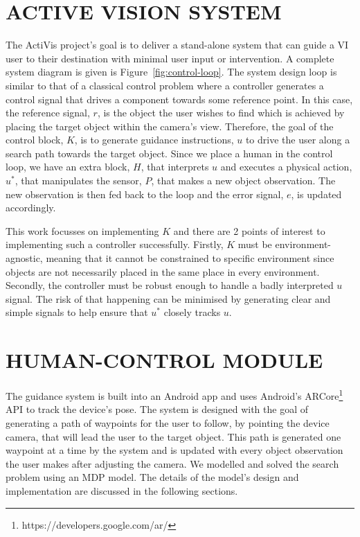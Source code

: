 \documentclass[a4paper, twoside]{article}
\begin{document}
\section{\uppercase{Active Vision System}}\label{sec:system-design}

\noindent The ActiVis project's goal is to deliver a stand-alone system that can guide a VI user to their destination with minimal user input or intervention. A complete system diagram is given is Figure~\ref{fig:control-loop}. The system design loop is similar to that of a classical control problem where a controller generates a control signal that drives a component towards some reference point. In this case, the reference signal, $r$, is the object the user wishes to find which is achieved by placing the target object within the camera's view. Therefore, the goal of the control block, $K$, is to generate guidance instructions, $u$ to drive the user along a search path towards the target object. Since we place a human in the control loop, we have an extra block, $H$, that interprets $u$ and executes a physical action, $u^*$, that manipulates the sensor, $P$, that makes a new object observation. The new observation is then fed back to the loop and the error signal, $e$, is updated accordingly.  

This work focusses on implementing $K$ and there are 2 points of interest to implementing such a controller successfully. Firstly, $K$ must be environment-agnostic, meaning that it cannot be constrained to specific environment since objects are not necessarily placed in the same place in every environment. Secondly, the controller must be robust enough to handle a badly interpreted $u$ signal. The risk of that happening can be minimised by generating clear and simple signals to help ensure that $u^*$ closely tracks $u$. 

\section{\uppercase{Human-control Module}}\label{sec:controller-design}

\noindent The guidance system is built into an Android app and uses Android's ARCore\footnote{https://developers.google.com/ar/} API to track the device's pose. The system is designed with the goal of generating a path of waypoints for the user to follow, by pointing the device camera, that will lead the user to the target object. This path is generated one waypoint at a time by the system and is updated with every object observation the user makes after adjusting the camera. We modelled and solved the search problem using an MDP model. The details of the model's design and implementation are discussed in the following sections. %
\end{document}

